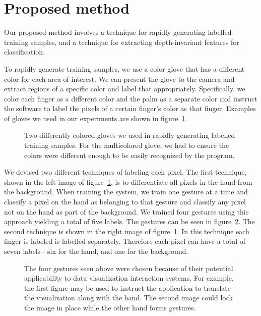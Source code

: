 \documentclass[11pt]{article}
\newcommand{\includeimage}[2] {\fbox{ \texttt{[image: \#2]}}}
\begin{document}
\section{Proposed method}
Our proposed method involves a technique for rapidly generating labelled training samples, and a technique for extracting depth-invariant features for classification.

To rapidly generate training samples, we use a color glove that has a different color for each area of interest. We can present the glove to the camera and extract regions of a specific color and label that appropriately. Specifically, we color each finger as a different color and the palm as a separate color and instruct the software to label the pixels of a certain finger's color as that finger. Examples of gloves we used in our experiments are shown in figure~\ref{fig:gloves}.

\begin{figure}
\begin{center}
\includeimage{50mm}{figures/blueglove.png}
\includeimage{50mm}{figures/colorglove.png}
\end{center}
\caption{Two differently colored gloves we used in rapidly generating labelled training samples. For the multicolored glove, we had to ensure the colors were different enough to be easily recognized by the program.}
\label{fig:gloves}
\end{figure}

We devised two different techniques of labeling each pixel. The first technique, shown in the left image of figure~\ref{fig:gloves}, is to differentiate all pixels in the hand from the background. When training the system, we train one gesture at a time and classify a pixel on the hand as belonging to that gesture and classify any pixel not on the hand as part of the background. We trained four gestures using this approach yielding a total of five labels. The gestures can be seen in figure~\ref{fig:gestures}. The second technique is shown in the right image of figure~\ref{fig:gloves}. In this technique each finger is labeled is labelled separately. Therefore each pixel can have a total of seven labels - six for the hand, and one for the background.

\begin{figure}
\begin{center}
\includeimage{35mm}{figures/gesture1.png}
\includeimage{35mm}{figures/gesture2.png}
\includeimage{35mm}{figures/gesture3.png}
\includeimage{35mm}{figures/gesture4.png}
\end{center}
\caption{The four gestures seen above were chosen because of their potential applicability to data visualization interaction systems. For example, the first figure may be used to instruct the application to translate the visualization along with the hand. The second image could lock the image in place while the other hand forms gestures.}
\label{fig:gestures}
\end{figure}
\end{document}
